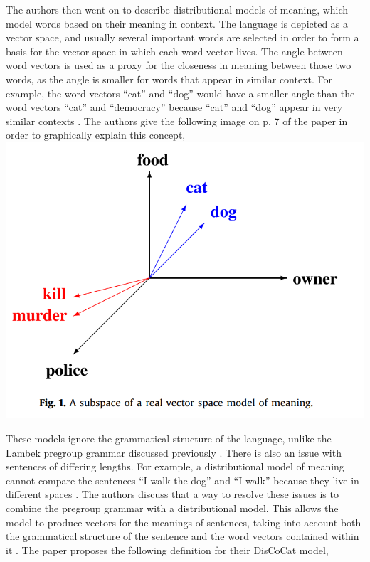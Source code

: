 \documentclass[11pt, reqno]{amsart}
\theoremstyle{plain}
\theoremstyle{definition}
\theoremstyle{example}
\begin{document}
\par
The authors then went on to describe distributional models of meaning, which model words based on their meaning in context. The language is depicted as a vector space, and usually several important words are selected in order to form a basis for the vector space in which each word vector lives. The angle between word vectors is used as a proxy for the closeness in meaning between those two words, as the angle is smaller for words that appear in similar context. For example, the word vectors ``cat'' and ``dog'' would have a smaller angle than the word vectors ``cat'' and ``democracy'' because ``cat'' and ``dog'' appear in very similar contexts \cite[\S 3]{lambekvlambek}. The authors give the following image on p. 7 of the paper in order to graphically explain this concept,\\

\includegraphics[scale=0.7]{vector_space}

\par
These models ignore the grammatical structure of the language, unlike the Lambek pregroup grammar discussed previously \cite[\S 3]{lambekvlambek}. There is also an issue with sentences of differing lengths. For example, a distributional model of meaning cannot compare the sentences ``I walk the dog'' and ``I walk'' because they live in different spaces \cite[\S 3]{lambekvlambek}. The authors discuss that a way to resolve these issues is to combine the pregroup grammar with a distributional model. This allows the model to produce vectors for the meanings of sentences, taking into account both the grammatical structure of the sentence and the word vectors contained within it \cite[\S 4]{lambekvlambek}. The paper proposes the following definition for their DisCoCat model,
\end{document}
